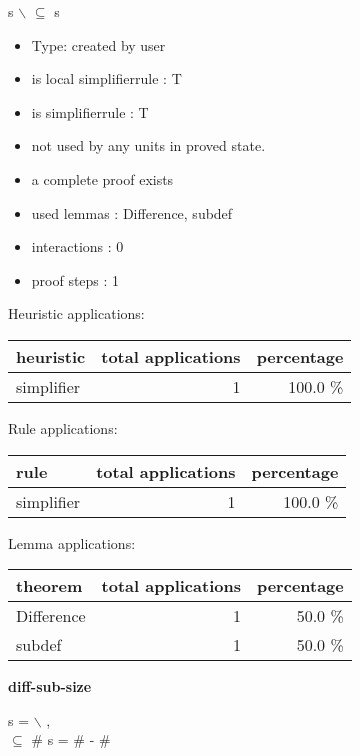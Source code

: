 \documentclass[a4paper]{article}
\begin{document}
 \Fol s $\backslash$  $\subseteq$ s

\begin{itemize}

\item Type: created by user

\item is local simplifierrule : T
\item is simplifierrule : T
\item not used by any units in proved state.
\item       a complete proof exists
\item       used lemmas  : Difference, subdef
\item       interactions : 0
\item       proof steps  : 1
\end{itemize}

\medskip


Heuristic applications:

\begin{supertabular}{l|r|r}
heuristic	& total applications & percentage \\ \hline
simplifier & 1 & 100.0 \% \\

\end{supertabular}

Rule applications:

\begin{supertabular}{l|r|r}
rule	        & total applications & percentage \\ \hline
simplifier & 1 & 100.0 \% \\

\end{supertabular}

Lemma applications:

\begin{supertabular}{l|r|r}
theorem	        & total applications & percentage \\ \hline
Difference & 1 & 50.0 \% \\
subdef & 1 & 50.0 \% \\

\end{supertabular}
\pagebreak

{\LARGE\bf diff-sub-size}\label{lemma-diff-sub-size}

\medskip

s =  $\backslash$ , \\
 $\subseteq$  \Fol \# s = \#  - \# 
\end{document}
